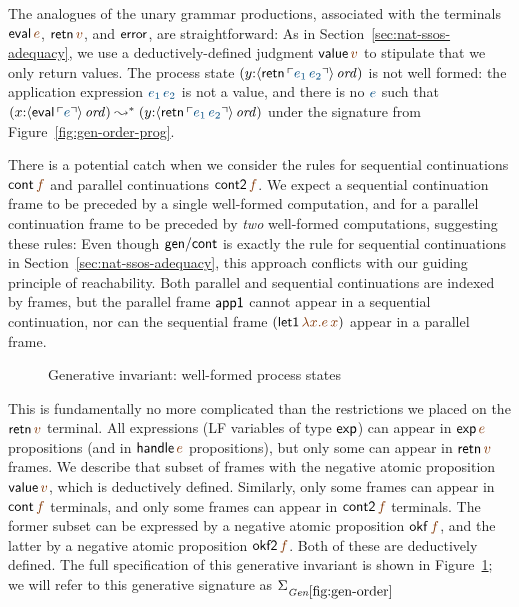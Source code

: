 The analogues of the unary grammar productions, associated with the
terminals ${\sf eval}\,\lf{e}$, ${\sf retn}\,\lf{v}$, and ${\sf
  error}$, are straightforward:
%
\smallskip
{}
\smallskip 
%
As in Section~\ref{sec:nat-ssos-adequacy}, we use a
deductively-defined judgment ${\sf value}\,\lf{v}$ to stipulate that
we only return values. The process state $(y{:}\istrue{\susp{{\sf
      retn}\,\interp{e_1\,e_2}}})$ is not well formed: the
application expression $\obj{e_1\,e_2}$ is not a value, and
there is no $\obj{e}$ such that $(x{:}\istrue{\susp{{\sf
      eval}\,\interp{e}}}) \leadsto^* (y{:}\istrue{\susp{{\sf
      retn}\,\interp{e_1\,e_2}}})$ under the signature from
Figure~\ref{fig:gen-order-prog}.

There is a potential catch when we consider the rules for sequential
continuations ${\sf cont}\,\lf{f}$ and parallel continuations ${\sf
  cont2}\,\lf{f}$. We expect a sequential continuation frame to be
preceded by a single well-formed computation, and for a parallel
continuation frame to be preceded by {\it two} well-formed
computations, suggesting these rules:
%
\smallskip
{}
\smallskip 
%
Even though ${\sf gen/cont}$ is exactly the rule for sequential
continuations in Section~\ref{sec:nat-ssos-adequacy}, this approach
conflicts with our guiding principle of reachability.
Both parallel and sequential continuations are indexed by
frames, but the parallel frame ${\sf app1}$ cannot appear in a
sequential continuation, nor can the sequential frame $({\sf
  let1}\,\lf{\lambda x.e\,x})$ appear in a parallel frame. 

\begin{figure}[tp]
\caption{Generative invariant: well-formed process states}
\label{fig:gen-order} 
\end{figure}

\newcommand{\siggenorder}{\Sigma_{\it Gen\ref{fig:gen-order}}}
\newcommand{\siggenordertp}{\Sigma_{\it Gen\ref{fig:gen-ordertp}}}
\newcommand{\siggenstate}{\Sigma_{\it Gen\ref{fig:gen-state}}}
\newcommand{\siggendests}{\Sigma_{\it Gen\ref{fig:gen-destinations}}}

This is fundamentally no more complicated than the restrictions we
placed on the ${\sf retn}\,\lf{v}$ terminal. All expressions (LF
variables of type ${\sf exp}$) can appear in ${\sf exp}\,\lf{e}$
propositions (and in ${\sf handle}\,\lf{e}$ propositions), but only
some can appear in ${\sf retn}\,\lf{v}$ frames. We describe that
subset of frames with the negative atomic proposition ${\sf
  value}\,\lf{v}$, which is deductively defined. Similarly, only some
frames can appear in ${\sf cont}\,\lf{f}$ terminals, and only some
frames can appear in ${\sf cont2}\,\lf{f}$ terminals. The former subset
can be expressed by a negative atomic proposition ${\sf okf}\,\lf{f}$,
and the latter by a negative atomic proposition ${\sf okf2}\,\lf{f}$.
Both of these are deductively defined.  The full specification of this
generative invariant is shown in Figure~\ref{fig:gen-order}; we will
refer to this generative signature as $\siggenorder$

